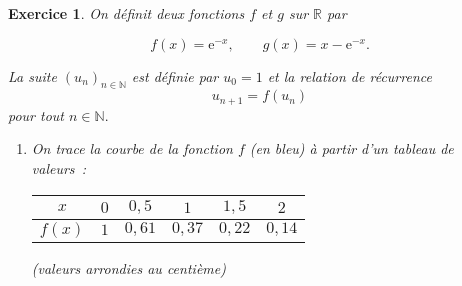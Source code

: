 \documentclass[10pt]{article}
\newtheorem{exo}{Exercice}
\begin{document}
 \begin{exo}
 
 On définit deux fonctions $f$ et $g$ sur $\mathbb{R}$ par 
 
 \[ f(x)=\text{e}^{-x},\qquad g(x)=x-\text{e}^{-x}.\]
 
 La suite $(u_n)_{n\in\mathbb{N}}$ est définie par $u_0=1$ et la relation de récurrence \[u_{n+1}=f\left(u_n\right)\] pour tout $n\in\mathbb{N}.$
 
 \begin{enumerate}
  \item On trace la courbe de la fonction $f$ (en bleu) à partir d'un tableau de valeurs~:

\medskip
\begin{center}
 \begin{tabular}{|c|c|c|c|c|c|}\hline
$x$&$0$& $0,5$ &$1$&$1,5$&$2$ \\ \hline 
$f(x)$&$1$&$0,61$ &$0,37$&$0,22$&$0,14$  \\ \hline
\end{tabular}
\medskip

(valeurs arrondies au centième)

\end{center}






\end{enumerate}
\end{exo}
\end{document}
